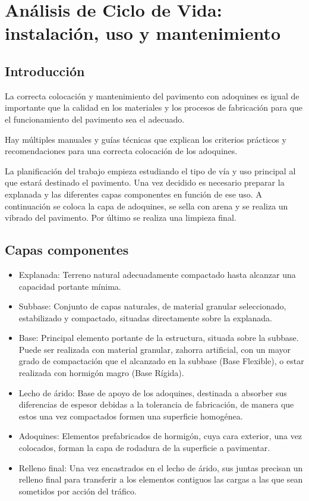 \chapter{Análisis de Ciclo de Vida: instalación, uso y mantenimiento}
\section{Introducción}
La correcta colocación y mantenimiento del pavimento con adoquines es igual de importante que la calidad en los materiales y los procesos de fabricación \cite{euroadoquinc} para que el funcionamiento del pavimento sea el adecuado.

Hay múltiples manuales y guías técnicas que explican los criterios prácticos y recomendaciones para una correcta colocación de los adoquines.

La planificación del trabajo empieza estudiando el tipo de vía y uso principal al que estará destinado el pavimento. Una vez decidido es necesario preparar la explanada y las diferentes capas componentes en función de ese uso. A continuación se coloca la capa de adoquines, se sella con arena y se realiza un vibrado del pavimento. Por último se realiza una limpieza final.

\section{Capas componentes}

\begin{itemize}
\item Explanada: Terreno natural adecuadamente compactado hasta alcanzar una capacidad portante mínima.
\item Subbase: Conjunto de capas naturales, de material granular seleccionado, estabilizado y compactado, situadas directamente sobre la explanada.
\item Base: Principal elemento portante de la estructura, situada sobre la subbase. Puede ser realizada con material granular, zahorra artificial, con un mayor grado de compactación que el alcanzado en la subbase (Base Flexible), o estar realizada con hormigón magro (Base Rígida).
\item Lecho de árido: Base de apoyo de los adoquines, destinada a absorber sus diferencias de espesor debidas a la tolerancia de fabricación, de manera que estos una vez compactados formen una superficie homogénea.
\item Adoquines: Elementos prefabricados de hormigón, cuya cara exterior, una vez colocados, forman la capa de rodadura de la superficie a pavimentar.
\item Relleno final: Una vez encastrados en el lecho de árido, sus juntas precisan un relleno final para transferir a los elementos contiguos las cargas a las que sean sometidos por acción del tráfico.
\end{itemize}

